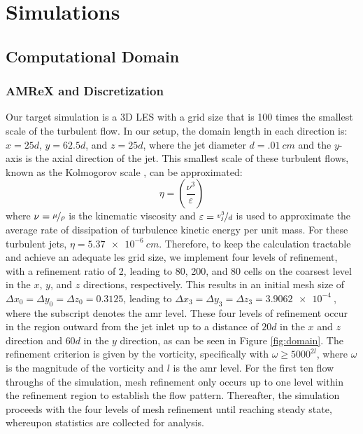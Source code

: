 \chapter{Simulations}


\section{Computational Domain}
\subsection{AMReX and Discretization}
Our target simulation is a 3D LES with a grid size that is 100 times the smallest scale of the turbulent flow. In our setup, the domain length in each direction is: $x = 25d$, $y = 62.5d$, and $z = 25d$, where the jet diameter $d=\SI{.01}{cm}$ and the $y$-axis is the axial direction of the jet. This smallest scale of these turbulent flows, known as the Kolmogorov scale \cite{kolmogorov}, can be approximated:
\begin{equation} \label{Kolmogorov}
	\eta = \left( \dfrac{\nu^3}{\varepsilon} \right)
\end{equation}
where $\nu = \nicefrac{\mu}{\rho}$ is the kinematic viscosity and $\varepsilon = \nicefrac{v_j^3}{d}$ is used to approximate the average rate of dissipation of turbulence kinetic energy per unit mass. For these turbulent jets, $\eta = \SI{5.37e-6}{cm}$. Therefore, to keep the calculation tractable and achieve an adequate \gls{les} grid size, we implement four levels of refinement, with a refinement ratio of 2, leading to 80, 200, and 80 cells on the coarsest level in the $x$, $y$, and $z$ directions, respectively. This results in an initial mesh size of $\Delta x_{0}=\Delta y_{0}=\Delta z_{0}=0.3125$, leading to $\Delta x_{3}=\Delta y_{3}=\Delta z_{3}=\SI{3.9062e-4}{}$, where the subscript denotes the \gls{amr} level. These four levels of refinement occur in the region outward from the jet inlet up to a distance of $20d$ in the $x$ and $z$ direction and $60d$ in the $y$ direction, as can be seen in Figure \ref{fig:domain}. The refinement criterion is given by the vorticity, specifically with $\omega \geq 5000^{2l}$, where $\omega$ is the magnitude of the vorticity and $l$ is the \gls{amr} level. For the first ten flow throughs of the simulation, mesh refinement only occurs up to one level within the refinement region to establish the flow pattern. Thereafter, the simulation proceeds  with the four levels of mesh refinement until reaching steady state, whereupon statistics are collected for analysis.
